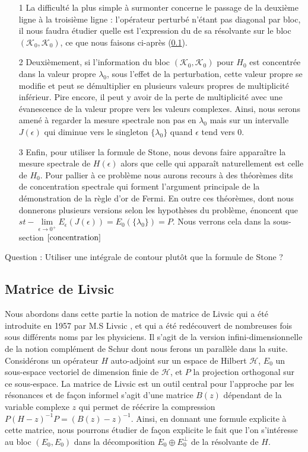 \documentclass[12pt,openany,a4paper, titlepage]{article}
\newcommand{\HH}{\mathcal{H}}
\newcommand{\KK}{\mathcal{K}}
\newcommand{\inv}{^{-1}}
\newcommand{\limeo}{\lim\limits_{\epsilon \rightarrow 0^+}}
\theoremstyle{definition}
\theoremstyle{definition}
\theoremstyle{definition}
\theoremstyle{definition}
\theoremstyle{definition}
\theoremstyle{definition}
\begin{document}
\begin{enumerate}
    \item[1] La difficulté la plus simple à surmonter concerne le passage de la deuxième ligne à la troisième ligne : l'opérateur perturbé n'étant pas diagonal par bloc, il nous faudra étudier quelle est l'expression du de sa résolvante sur le bloc $(\KK_0,\KK_0)$, ce que nous faisons ci-après (\ref{matrice_livsic}).
    \item[2] Deuxièmement, si l'information du bloc $(\KK_0,\KK_0)$ pour $H_0$ est concentrée dans la valeur propre $\lambda_0$, sous l'effet de la perturbation, cette valeur propre se modifie et peut se démultiplier en plusieurs valeurs propres de multiplicité inférieur. Pire encore, il peut y avoir de la perte de multiplicité avec une évanescence de la valeur propre vers les valeurs complexes. Ainsi, nous serons amené à regarder la mesure spectrale non pas en $\lambda_0$ mais sur un intervalle $J(\epsilon)$ qui diminue vers le singleton $\{\lambda_0\}$ quand $\epsilon$ tend vers $0$.
    \item[3] Enfin, pour utiliser la formule de Stone, nous devons faire apparaître la mesure spectrale de $H(\epsilon)$ alors que celle qui apparaît naturellement est celle de $H_0$. Pour pallier à ce problème nous aurons recours à des théorèmes dits de concentration spectrale qui forment l'argument principale de la démonstration de la règle d'or de Fermi. En outre ces théorèmes, dont nous donnerons plusieurs versions selon les hypothèses du problème, énoncent que $st-\limeo E_\epsilon(J(\epsilon)) = E_0(\{\lambda_0\}) = P$. Nous verrons cela dans la sous-section $\ref{concentration}$
\end{enumerate}

Question : Utiliser une intégrale de contour plutôt que la formule de Stone ?

\newpage
\subsection{Matrice de Livsic}\label{matrice_livsic}

Nous abordons dans cette partie la notion de matrice de Livsic qui a été introduite en 1957 par M.S Livsic \cite{HOWLAND1975415}, et qui a été redécouvert de nombreuses fois sous différents noms par les physiciens. Il s'agit de la version infini-dimensionnelle de la notion complément de Schur dont nous ferons un parallèle dans la suite. Considérons un opérateur $H$ auto-adjoint sur un espace de Hilbert $\HH$, $E_0$ un sous-espace vectoriel de dimension finie de $\HH$, et $P$ la projection orthogonal sur ce sous-espace. La matrice de Livsic est un outil central pour l'approche par les résonances et de façon informel s'agit d'une matrice $B(z)$ dépendant de la variable complexe $z$ qui permet de réécrire la compression $P(H-z)\inv P = (B(z) -z)\inv$. Ainsi, en donnant une formule explicite à cette matrice, nous pourrons étudier de façon explicite le fait que l'on s'intéresse au bloc $(E_0,E_0)$ dans la décomposition $E_0\oplus E_0^\perp$ de la résolvante de $H$.
\end{document}
